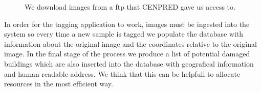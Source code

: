\begin{figure}[h]
  \begin{center}
  \end{center}
  \label{fig:ingest}
  \caption{We download images from a ftp that CENPRED gave us access to.}
\end{figure}


In order for the tagging application to work, images must be ingested into the system so every time a new sample is tagged we populate the database with information about the original image and the coordinates relative to the original image. In the final stage of the process we produce a list of potential damaged buildings which are also inserted into the database with geografical information and human readable address. We think that this can be helpfull to allocate resources in the most efficient way.\\

